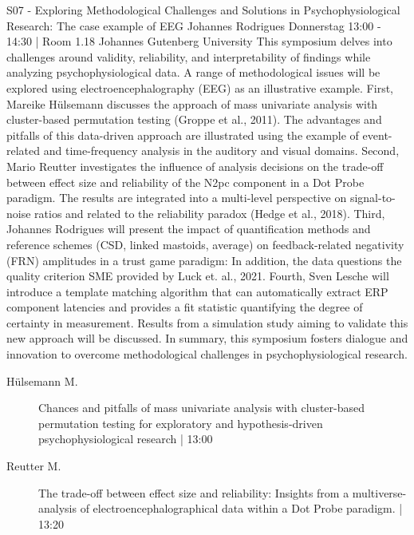 
            \begin{symposium}
            {S07 - Exploring Methodological Challenges and Solutions in Psychophysiological Research: The case example of EEG}
            {Johannes Rodrigues}
            {Donnerstag 13:00 - 14:30 | Room 1.18}
            {Johannes Gutenberg University}
            This symposium delves into challenges around validity, reliability, and interpretability of findings while analyzing psychophysiological data. A range of methodological issues will be explored using electroencephalography (EEG) as an illustrative example.
First, Mareike Hülsemann discusses the approach of mass univariate analysis with cluster-based permutation testing (Groppe et al., 2011). The advantages and pitfalls of this data-driven approach are illustrated using the example of event-related and time-frequency analysis in the auditory and visual domains.
Second, Mario Reutter investigates the influence of analysis decisions on the trade-off between effect size and reliability of the N2pc component in a Dot Probe paradigm. The results are integrated into a multi-level perspective on signal-to-noise ratios and related to the reliability paradox (Hedge et al., 2018).
Third, Johannes Rodrigues will present the impact of quantification methods and reference schemes (CSD, linked mastoids, average) on feedback-related negativity (FRN) amplitudes in a trust game paradigm: In addition, the data questions the quality criterion SME provided by Luck et. al., 2021.
Fourth, Sven Lesche will introduce a template matching algorithm that can automatically extract ERP component latencies and provides a fit statistic quantifying the degree of certainty in measurement. Results from a simulation study aiming to validate this new approach will be discussed.
In summary, this symposium fosters dialogue and innovation to overcome methodological challenges in psychophysiological research.
            \begin{description}    
            
                \item [ Hülsemann M.] Chances and pitfalls of mass univariate analysis with cluster-based permutation testing for exploratory and hypothesis-driven psychophysiological research  \textcolor{mygray}{ | 13:00}    
                
                \item [ Reutter M.] The trade-off between effect size and reliability: Insights from a multiverse-analysis of electroencephalographical data within a Dot Probe paradigm. \textcolor{mygray}{ | 13:20}    
                

\end{description}
\end{symposium}
